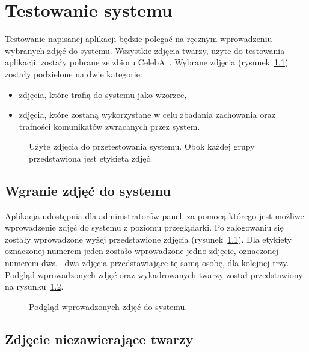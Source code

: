 \chapter{Testowanie systemu}

Testowanie napisanej aplikacji będzie polegać na ręcznym wprowadzeniu wybranych zdjęć do systemu.
Wszystkie zdjęcia twarzy, użyte do testowania aplikacji, zostały pobrane ze zbioru CelebA~\cite{microsoft-2020-celeb1m}.
Wybrane zdjęcia (rysunek~\ref{fig:zdjeciadotestow}) zostały podzielone na dwie kategorie:

\begin{itemize}
    \item zdjęcia, które trafią do systemu jako wzorzec,
    \item zdjęcia, które zostaną wykorzystane w celu zbadania zachowania oraz trafności
    komunikatów zwracanych przez system.
\end{itemize}

\begin{figure}[H]
    \centering
    \caption{Użyte zdjęcia do przetestowania systemu. Obok każdej grupy przedstawiona jest etykieta zdjęć.}
    \customsource
    \label{fig:zdjeciadotestow}
\end{figure}

\pagebreak


\section{Wgranie zdjęć do systemu}

Aplikacja udostępnia dla administratorów panel, za pomocą którego jest możliwe wprowadzenie
zdjęć do systemu z poziomu przeglądarki.
Po zalogowaniu się zostały wprowadzone wyżej przedstawione zdjęcia (rysunek~\ref{fig:zdjeciadotestow}).
Dla etykiety oznaczonej numerem jeden zostało wprowadzone jedno zdjęcie,
oznaczonej numerem dwa - dwa zdjęcia przedstawiające tę samą osobę, dla kolejnej trzy.
Podgląd wprowadzonych zdjęć oraz wykadrowanych twarzy został przedstawiony na rysunku~\ref{fig:po_wprowadzeniu}.

\begin{figure}[H]
    \centering
    \caption{ Podgląd wprowadzonych zdjęć do systemu. }
    \customsource
    \label{fig:po_wprowadzeniu}
\end{figure}

\pagebreak


\section{Zdjęcie niezawierające twarzy}

